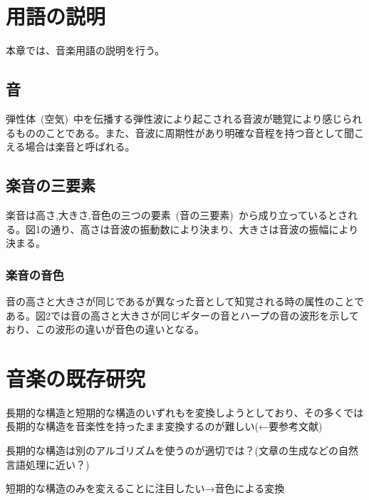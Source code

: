 \chapter{用語の説明}

本章では、音楽用語の説明を行う。


\section{音}

弾性体~(空気)~中を伝播する弾性波により起こされる音波が聴覚により感じられるもののことである。また、音波に周期性があり明確な音程を持つ音として聞こえる場合は楽音と呼ばれる。

\section{楽音の三要素}

楽音は高さ,大きさ,音色の三つの要素~(音の三要素)~から成り立っているとされる。図1の通り、高さは音波の振動数により決まり、大きさは音波の振幅により決まる。

\subsection{楽音の音色}

音の高さと大きさが同じであるが異なった音として知覚される時の属性のことである。図2では音の高さと大きさが同じギターの音とハープの音の波形を示しており、この波形の違いが音色の違いとなる。








\chapter{音楽の既存研究}


長期的な構造と短期的な構造のいずれもを変換しようとしており、その多くでは長期的な構造を音楽性を持ったまま変換するのが難しい(←要参考文献)

長期的な構造は別のアルゴリズムを使うのが適切では？(文章の生成などの自然言語処理に近い？)

短期的な構造のみを変えることに注目したい→音色による変換

